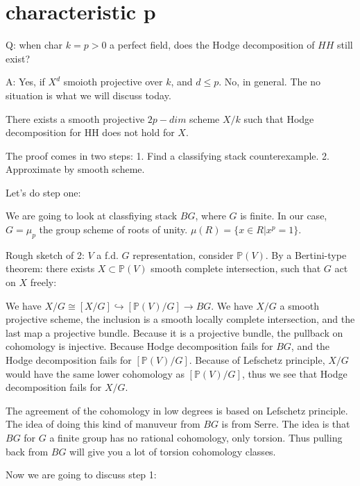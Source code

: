 \documentclass[../main.tex]{subfiles}
\begin{document}
\section{characteristic p}

Q: when char $k = p > 0$ a perfect field, does the Hodge decomposition of $HH$ still exist?

A: Yes, if $X^d$ smoioth projective over $k$, and $d \leq p$. No, in general. The no situation is what we will discuss today.

\begin{theorem} 
There exists a smooth projective $2p-dim$ scheme $X/k$ such that Hodge decomposition for HH does not hold for $X$.


\end{theorem}

The proof comes in two steps:
1. Find a classifying stack counterexample.
2. Approximate by smooth scheme.

Let's do step one:

We are going to look at classfiying stack $BG$, where $G$ is finite. In our case, $G = \mu_p$ the group scheme of roots of unity. $\mu(R) = \{x \in R| x^p = 1\}$. 

Rough sketch of 2:
$V$ a f.d. $G$ representation, consider $\mathbb{P}(V)$. By a Bertini-type theorem: there exists $X \subset \mathbb{P}(V)$ smooth complete intersection, such that $G$ act on $X$ freely:

We have $X/G \cong [X/G] \hookrightarrow [\mathbb{P}(V)/G] \rightarrow BG$. We have $X/G$ a smooth projective scheme, the inclusion is a smooth locally complete intersection, and the last map a projective bundle. Because it is a projective bundle, the pullback on cohomology is injective. Because Hodge decomposition fails for $BG$, and the Hodge decomposition fails for $[\mathbb{P}(V)/G]$. Because of Lefschetz principle, $X/G$ would have the same lower cohomology as $[\mathbb{P}(V)/G]$, thus we see that Hodge decomposition fails for $X/G$.

\begin{remark}[Sam]
The agreement of the cohomology in low degrees is based on Lefschetz principle. The idea of doing this kind of manuveur from $BG$ is from Serre. The idea is that $BG$ for $G$ a finite group has no rational cohomology, only torsion. Thus pulling back from $BG$ will give you a lot of torsion cohomology classes.
\end{remark}

Now we are going to discuss step 1:
\end{document}
